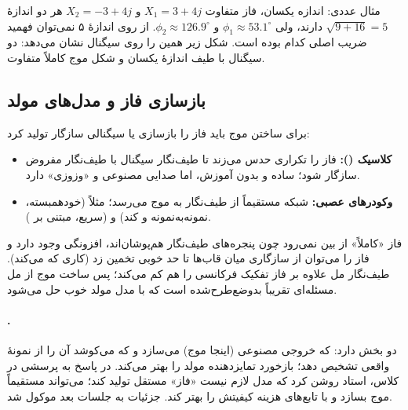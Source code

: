 \begin{addedbox}{مثال عددی: اندازه یکسان، فاز متفاوت}
$X_1 = 3+4j$ و $X_2 = -3+4j$ هر دو اندازهٔ $\sqrt{9+16}=5$ دارند، ولی $\phi_1 \approx 53.1^\circ$ و $\phi_2 \approx 126.9^\circ$. از روی اندازهٔ ۵ نمی‌توان فهمید ضریب اصلی کدام بوده است. شکل زیر همین را روی سیگنال نشان می‌دهد: دو سیگنال با طیف اندازهٔ یکسان و شکل موج کاملاً متفاوت.
\end{addedbox}


\subsection{بازسازی فاز و مدل‌های مولد}
برای ساختن موج باید فاز را بازسازی یا سیگنالی سازگار تولید کرد:
\begin{itemize}
  \item \textbf{کلاسیک ():} فاز را تکراری حدس می‌زند تا طیف‌نگار سیگنال با طیف‌نگار مفروض سازگار شود؛ ساده و بدون آموزش، اما صدایی مصنوعی و «وزوزی» دارد.
  \item \textbf{وکودرهای عصبی:} شبکه مستقیماً از طیف‌نگار به موج می‌رسد؛ مثلاً  (خودهمبسته، نمونه‌به‌نمونه و کند) و  (سریع، مبتنی بر ).
\end{itemize}

\begin{correctionbox}{فاز «کاملاً» از بین نمی‌رود}
چون پنجره‌های طیف‌نگار هم‌پوشان‌اند، افزونگی وجود دارد و فاز را می‌توان از سازگاری میان قاب‌ها تا حد خوبی تخمین زد (کاری که  می‌کند). طیف‌نگار مل علاوه بر فاز تفکیک فرکانسی را هم کم می‌کند؛ پس ساخت موج از مل مسئله‌ای تقریباً بدوضع‌طرح‌شده است که با مدل مولد خوب حل می‌شود.
\end{correctionbox}

\paragraph{.}  دو بخش دارد:  که خروجی مصنوعی (اینجا موج) می‌سازد و  که می‌کوشد آن را از نمونهٔ واقعی تشخیص دهد؛ بازخورد تمایزدهنده مولد را بهتر می‌کند. در پاسخ به پرسشی در کلاس، استاد روشن کرد که مدل لازم نیست «فاز» مستقل تولید کند؛ می‌تواند مستقیماً موج بسازد و با تابع‌های هزینه کیفیتش را بهتر کند. جزئیات به جلسات بعد موکول شد.

